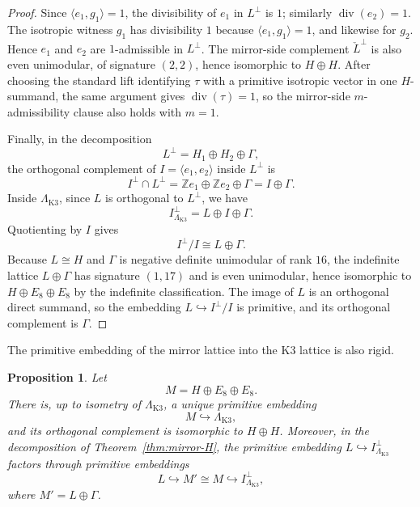 \documentclass[12pt]{article}
\theoremstyle{plain}
\newtheorem{proposition}[theorem]{Proposition}
\theoremstyle{definition}
\DeclareMathOperator{\divis}{div}
\newcommand{\bZ}{\mathbb{Z}}
\newcommand{\LambdaK}{\Lambda_{\mathrm{K3}}}
\newcommand{\Lcheck}{\check{L}}
\begin{document}
\begin{proof}
Since $\langle e_1,g_1\rangle=1$, the divisibility of $e_1$ in $L^\perp$ is $1$; similarly $\divis(e_2)=1$.  The isotropic witness $g_1$ has divisibility $1$ because $\langle e_1,g_1\rangle=1$, and likewise for $g_2$.  Hence $e_1$ and $e_2$ are $1$-admissible in $L^\perp$.  The mirror-side complement $\Lcheck^\perp$ is also even unimodular, of signature $(2,2)$, hence isomorphic to $H\oplus H$.  After choosing the standard lift identifying $\tau$ with a primitive isotropic vector in one $H$-summand, the same argument gives $\divis(\tau)=1$, so the mirror-side $m$-admissibility clause also holds with $m=1$.

Finally, in the decomposition
\[
L^\perp = H_1\oplus H_2\oplus \Gamma,
\]
the orthogonal complement of $I=\langle e_1,e_2\rangle$ inside $L^\perp$ is
\[
I^\perp\cap L^\perp = \bZ e_1\oplus \bZ e_2\oplus \Gamma = I\oplus \Gamma.
\]
Inside $\LambdaK$, since $L$ is orthogonal to $L^\perp$, we have
\[
I^\perp_{\LambdaK} = L\oplus I\oplus \Gamma.
\]
Quotienting by $I$ gives
\[
I^\perp/I \cong L\oplus \Gamma.
\]
Because $L\cong H$ and $\Gamma$ is negative definite unimodular of rank $16$, the indefinite lattice $L\oplus\Gamma$ has signature $(1,17)$ and is even unimodular, hence isomorphic to $H\oplus E_8\oplus E_8$ by the indefinite classification.  The image of $L$ is an orthogonal direct summand, so the embedding $L\hookrightarrow I^\perp/I$ is primitive, and its orthogonal complement is $\Gamma$.
\end{proof}

The primitive embedding of the mirror lattice into the K3 lattice is also rigid.

\begin{proposition}\label{prop:primitive-embedding}
Let
\[
M = H\oplus E_8\oplus E_8.
\]
There is, up to isometry of $\LambdaK$, a unique primitive embedding
\[
M\hookrightarrow \LambdaK,
\]
and its orthogonal complement is isomorphic to $H\oplus H$.  Moreover, in the decomposition of Theorem~\ref{thm:mirror-H}, the primitive embedding $L\hookrightarrow I^\perp_{\LambdaK}$ factors through primitive embeddings
\[
L\hookrightarrow M'\cong M\hookrightarrow I^\perp_{\LambdaK},
\]
where $M' = L\oplus\Gamma$.
\end{proposition}
\end{document}
